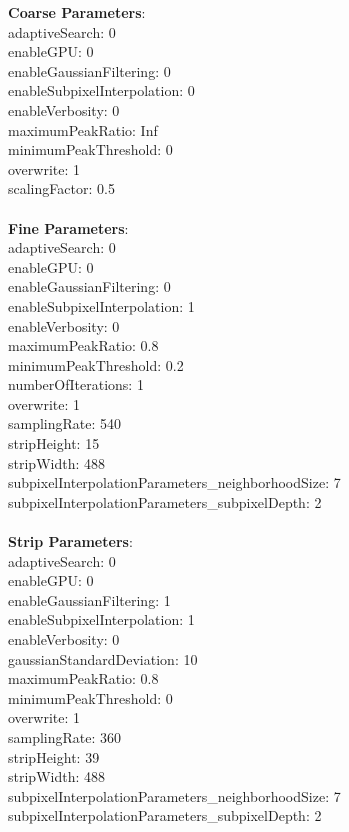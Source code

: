 \documentclass[11pt]{article}
\begin{document}
\textbf{Coarse Parameters}: \\
adaptiveSearch: 0\\
enableGPU: 0\\
enableGaussianFiltering: 0\\
enableSubpixelInterpolation: 0\\
enableVerbosity: 0\\
maximumPeakRatio: Inf\\
minimumPeakThreshold: 0\\
overwrite: 1\\
scalingFactor: 0.5\\
\\
\textbf{Fine Parameters}: \\
adaptiveSearch: 0\\
enableGPU: 0\\
enableGaussianFiltering: 0\\
enableSubpixelInterpolation: 1\\
enableVerbosity: 0\\
maximumPeakRatio: 0.8\\
minimumPeakThreshold: 0.2\\
numberOfIterations: 1\\
overwrite: 1\\
samplingRate: 540\\
stripHeight: 15\\
stripWidth: 488\\
subpixelInterpolationParameters\_neighborhoodSize: 7\\
subpixelInterpolationParameters\_subpixelDepth: 2\\
\\
\textbf{Strip Parameters}: \\
adaptiveSearch: 0\\
enableGPU: 0\\
enableGaussianFiltering: 1\\
enableSubpixelInterpolation: 1\\
enableVerbosity: 0\\
gaussianStandardDeviation: 10\\
maximumPeakRatio: 0.8\\
minimumPeakThreshold: 0\\
overwrite: 1\\
samplingRate: 360\\
stripHeight: 39\\
stripWidth: 488\\
subpixelInterpolationParameters\_neighborhoodSize: 7\\
subpixelInterpolationParameters\_subpixelDepth: 2\\
\\
\newpage
\end{document}

